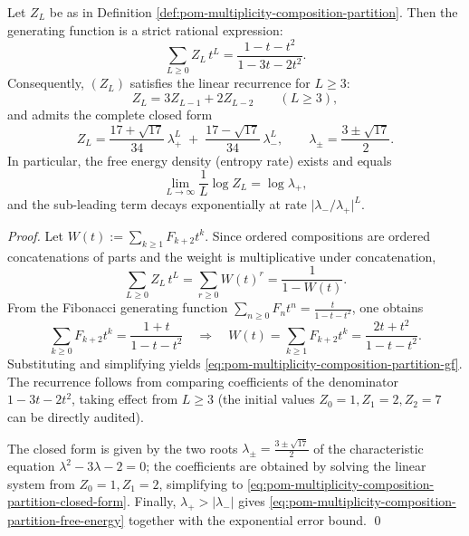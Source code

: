 \begin{proposition}\label{prop:pom-multiplicity-composition-partition-rational}
Let \(Z_L\) be as in Definition \ref{def:pom-multiplicity-composition-partition}.
Then the generating function is a strict rational expression:
\begin{equation}\label{eq:pom-multiplicity-composition-partition-gf}
\boxed{\;
\sum_{L\ge 0} Z_L\,t^L=\frac{1-t-t^2}{1-3t-2t^2}.\;}
\end{equation}
Consequently, \((Z_L)\) satisfies the linear recurrence for \(L\ge 3\):
\[
\boxed{\;
Z_L=3Z_{L-1}+2Z_{L-2}\qquad(L\ge 3),\;}
\]
and admits the complete closed form
\begin{equation}\label{eq:pom-multiplicity-composition-partition-closed-form}
\boxed{\;
Z_L=\frac{17+\sqrt{17}}{34}\,\lambda_+^{L}
\;+\;
\frac{17-\sqrt{17}}{34}\,\lambda_-^{L},\qquad
\lambda_\pm=\frac{3\pm\sqrt{17}}{2}.\;}
\end{equation}
In particular, the free energy density (entropy rate) exists and equals
\begin{equation}\label{eq:pom-multiplicity-composition-partition-free-energy}
\boxed{\;
\lim_{L\to\infty}\frac1L\log Z_L=\log\lambda_+,\;}
\end{equation}
and the sub-leading term decays exponentially at rate \(\bigl|\lambda_-/\lambda_+\bigr|^L\).
\end{proposition}
\begin{proof}
Let
\(
W(t):=\sum_{k\ge 1}F_{k+2}t^k
\).
Since ordered compositions are ordered concatenations of parts and the weight is multiplicative under concatenation,
\[
\sum_{L\ge 0} Z_L\,t^L
=\sum_{r\ge 0} W(t)^r
=\frac{1}{1-W(t)}.
\]
From the Fibonacci generating function
\(
\sum_{n\ge 0}F_n t^n=\frac{t}{1-t-t^2}
\),
one obtains
\[
\sum_{k\ge 0}F_{k+2}t^k=\frac{1+t}{1-t-t^2}
\quad\Longrightarrow\quad
W(t)=\sum_{k\ge 1}F_{k+2}t^k=\frac{2t+t^2}{1-t-t^2}.
\]
Substituting and simplifying yields \eqref{eq:pom-multiplicity-composition-partition-gf}.
The recurrence follows from comparing coefficients of the denominator \(1-3t-2t^2\), taking effect from \(L\ge 3\) (the initial values \(Z_0=1,Z_1=2,Z_2=7\) can be directly audited).
\par
The closed form is given by the two roots \(\lambda_\pm=\frac{3\pm\sqrt{17}}{2}\) of the characteristic equation
\(
\lambda^2-3\lambda-2=0
\);
the coefficients are obtained by solving the linear system from \(Z_0=1,Z_1=2\), simplifying to \eqref{eq:pom-multiplicity-composition-partition-closed-form}.
Finally, \(\lambda_+>|\lambda_-|\) gives \eqref{eq:pom-multiplicity-composition-partition-free-energy} together with the exponential error bound. \qed
\end{proof}

